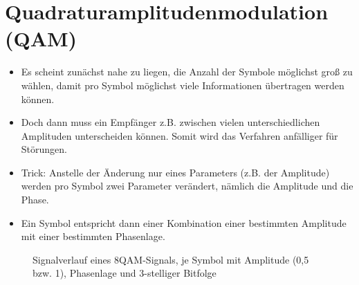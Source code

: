 
\section{Quadraturamplitudenmodulation  (QAM)}
\label{section:qam}
\begin{frame}%
\begin{itemize}
  \item Es scheint zunächst nahe zu liegen, die Anzahl der Symbole möglichst groß zu wählen, damit pro Symbol möglichst viele Informationen übertragen werden können.
  \item Doch dann muss ein Empfänger z.B. zwischen vielen unterschiedlichen Amplituden unterscheiden können. Somit wird das Verfahren anfälliger für Störungen.
  \end{itemize}
\end{frame}

\begin{frame}\begin{itemize}
  \item Trick: Anstelle der Änderung nur eines Parameters (z.B. der Amplitude) werden pro Symbol zwei Parameter verändert, nämlich die Amplitude und die Phase.
  \item Ein Symbol entspricht dann einer Kombination einer bestimmten Amplitude mit einer bestimmten Phasenlage.
  \end{itemize}

\begin{figure}
    \caption{\scriptsize Signalverlauf eines 8QAM-Signals, je Symbol mit Amplitude (0,5 bzw. 1), Phasenlage und 3-stelliger Bitfolge}
    \label{8qam}
\end{figure}

\end{frame}

\begin{frame}
\end{frame}%
